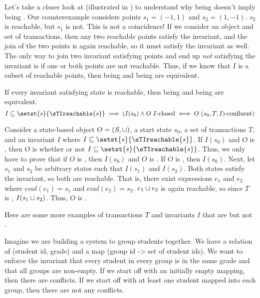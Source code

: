 

Let's take a closer look at  (illustrated in
) to understand why being \sTIconfluent{}
doesn't imply being \Iclosed{}. Our counterexample considers points $s_1 = (-1,
1)$ and $s_2 = (1, -1)$. $s_2$ is reachable, but $s_1$ is not. This is not a
coincidence! If we consider an \sTIconfluent{} object and set of transactions,
then any two reachable points satisfy the invariant, and the join of the two
points is again reachable, so it must satisfy the invariant as well. The only
way to join two invariant satisfying points and end up \emph{not} satisfying
the invariant is if one or both points are not reachable. Thus, if we know that
$I$ is a subset of reachable points, then being \sTIconfluent{} and being
\Iclosed{} are equivalent.

\begin{claim}
  If every invariant satisfying state is reachable, then being \sTIconfluent{}
  and being \Iclosed{} are equivalent.
  \[
    I \subseteq \setst{s}{\sTIreachable{s}} \implies
    (I(s_0) \land \text{$O$ \Iclosed{}} \iff \text{$O$ \sTIconfluent})
  \]
\end{claim}
\begin{elidableproof}
  Consider a state-based object $O = (S, \sqcup)$, a start state $s_0$, a set of
  transactions $T$, and an invariant $I$ where $I \subseteq
  \setst{s}{\sTIreachable{s}}$.
  If $I(s_0)$ and $O$ is \Iclosed{}, then $O$ is \sTIconfluent{} whether or not
  $I \subseteq \setst{s}{\sTIreachable{s}}$. Thus, we only have to prove that
  if $O$ is \sTIconfluent{}, then $I(s_0)$ and $O$ is \Iclosed.
  If $O$ is \sTIconfluent{}, then $I(s_0)$. Next, let $s_1$ and $s_2$ be
  arbitrary states such that $I(s_1)$ and $I(s_2)$. Both states satisfy the
  invariant, so both are reachable. That is, there exist expressions $e_1$ and
  $e_2$ where $eval(e_1) = s_1$  and $eval(e_2) = s_2$. $e_1 \sqcup e_2$ is
  again reachable, so since $T$ is \sTIconfluent{}, $I(s_1 \sqcup s_2)$.  Thus,
  $O$ is \Iclosed.
\end{elidableproof}

Here are some more examples of transactions $T$ and invariants $I$ that are
\sTIconfluent{} but not \Iclosed{}.


\begin{example}
  Imagine we are building a system to group students together. We have a relation
  of (student id, grade) and a map (group id -> set of student ids). We want to
  enforce the invariant that every student in every group is in the same grade
  and that all groups are non-empty. If we start off with an initially empty
  mapping, then there are conflicts. If we start off with at least one student
  mapped into each group, then there are not any conflicts.
\end{example}


